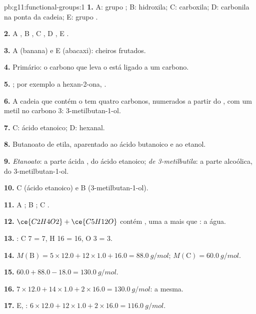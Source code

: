 \begin{solution}{pb:g11:functional-groups:1}
\textbf{1.} A: grupo ; B: hidroxila; C: carboxila; D: carbonila na
ponta da cadeia; E: grupo .

\textbf{2.} A , B , C , D , E .

\textbf{3.} A (banana) e E (abacaxi): cheiros frutados.

\textbf{4.} Primário: o carbono que leva o  está ligado a um
carbono.

\textbf{5.} ; por exemplo a hexan-2-ona,
.

\textbf{6.} A cadeia que contém o  tem quatro carbonos,
numerados a partir do , com um metil no carbono 3:
3-metilbutan-1-ol.

\textbf{7.} C: ácido etanoico; D: hexanal.

\textbf{8.} Butanoato de etila, aparentado ao ácido butanoico e ao
etanol.

\textbf{9.} \emph{Etanoato}: a parte ácida , do ácido
etanoico; \emph{de 3-metilbutila}: a parte alcoólica, do
3-metilbutan-1-ol.

\textbf{10.} C (ácido etanoico) e B (3-metilbutan-1-ol).

\textbf{11.} A ; B ; C .

\textbf{12.} $\ce{C2H4O2} + \ce{C5H12O}$ contém , uma
 a mais que : a água.

\textbf{13.} : C 7 = 7, H 16 = 16,
O 3 = 3.

\textbf{14.} $M(\text{B}) = 5 \times 12.0 + 12 \times 1.0 + 16.0 =
\qty{88.0}{g/mol}$; $M(\text{C}) = \qty{60.0}{g/mol}$.

\textbf{15.} $60.0 + 88.0 - 18.0 = \qty{130.0}{g/mol}$.

\textbf{16.} $7 \times 12.0 + 14 \times 1.0 + 2 \times 16.0 =
\qty{130.0}{g/mol}$: a mesma.

\textbf{17.} E, : $6 \times 12.0 + 12 \times 1.0 + 2 \times
16.0 = \qty{116.0}{g/mol}$.


\end{solution}
